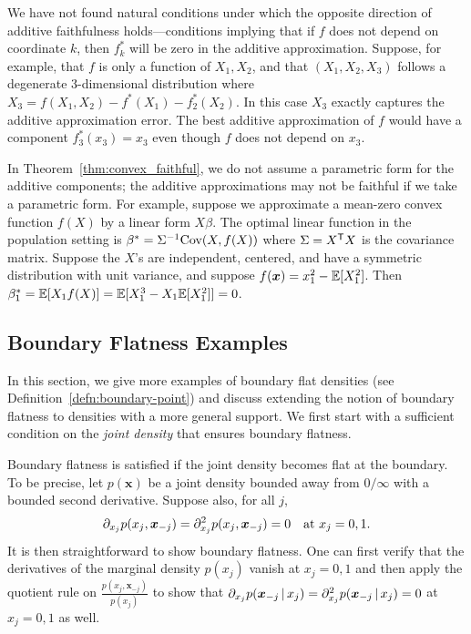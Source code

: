 \begin{remark} 
  We have not found natural conditions under which the opposite
  direction of additive faithfulness holds---conditions implying that if $f$ does not
  depend on coordinate $k$, then $f_k^*$ will be zero in the additive
  approximation.  Suppose, for example, that $f$ is only a
  function of $X_1, X_2$, and that $(X_1, X_2, X_3)$ follows a
  degenerate 3-dimensional distribution where $X_3 = f(X_1, X_2) -
  f^*(X_1) - f^*_2(X_2)$.  In this case $X_3$ exactly captures the
  additive approximation error.  The best additive
  approximation of $f$ would have a component $f^*_3(x_3) = x_3$ even
  though $f$ does not depend on $x_3$.
\end{remark}


\begin{remark}
In Theorem~\ref{thm:convex_faithful}, we do not assume a parametric
form for the additive components; the additive approximations may not
be faithful if we take a parametric form. For example, suppose we
approximate a mean-zero convex function $f(X)$ by a linear form $X
\beta$. The optimal linear function in the population setting is
$\beta^* = \Sigma^{-1} \textrm{Cov}(X, f(X))$ where $\Sigma = X^{\mathsf{T}} X$ is the
covariance matrix. Suppose the $X$'s are independent, centered, and have a
symmetric distribution with unit variance, and suppose $f(\mbox{\boldmath $x$})
= x_1^2 - {\mathbb E}[X_1^2]$. Then $\beta^*_1 = {\mathbb E}[ X_1 f(X)] = {\mathbb E}[ X_1^3 -
  X_1 {\mathbb E}[X_1^2]] = 0$.
\end{remark}

\subsection{Boundary Flatness Examples}
\label{sec:boundary_flat}

In this section, we give more examples of boundary flat densities (see
Definition~\ref{defn:boundary-point}) and discuss extending the notion
of boundary flatness to densities with a more general support. We
first start with a sufficient condition on the \emph{joint density}
that ensures boundary flatness.

\begin{example}
\label{ex:joint_density_flat}
Boundary flatness is satisfied if the joint density becomes flat at
the boundary. To be precise, let $p(\mathbf{x})$ be a joint density
bounded away from $0/\infty$ with a bounded second derivative.
Suppose also, for all $j$,
$$
\partial_{x_j} p(x_j,\mbox{\boldmath $x$}_{-j}) =
\partial_{x_j}^2 p(x_j, \mbox{\boldmath $x$}_{-j}) = 0\quad  \textrm{at $x_j = 0, 1$}.
$$ It is then straightforward to show boundary flatness. One can first
verify that the derivatives of the marginal density $p(x_j)$ vanish
at $x_j = 0,1$ and then apply the quotient rule on
$\frac{p(x_j, \mathbf{\scriptstyle x}_{-j})}{p(x_j)}$ to show that $\partial_{x_j}
p(\mbox{\boldmath $x$}_{-j} {\,|\,} x_j) = \partial_{x_j}^2 p(\mbox{\boldmath $x$}_{-j}
{\,|\,} x_j) = 0$ at $x_j = 0,1$ as well.
\end{example}

